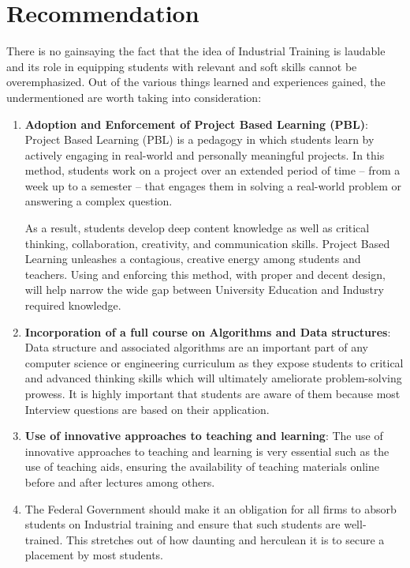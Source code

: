 \section{Recommendation}
There is no gainsaying the fact that the idea of Industrial Training is laudable and its role in equipping students with relevant and soft skills cannot be overemphasized. Out of the various things learned and experiences gained, the undermentioned are worth taking into consideration:
\begin{enumerate}
	\item \textbf{Adoption and Enforcement of Project Based Learning (PBL)}: Project Based Learning (PBL) is a pedagogy in which students learn by actively engaging in real-world and personally meaningful projects. In this method, students work on a project over an extended period of time – from a week up to a semester – that engages them in solving a real-world problem or answering a complex question.
	
	As a result, students develop deep content knowledge as well as critical thinking, collaboration, creativity, and communication skills. Project Based Learning unleashes a contagious, creative energy among students and teachers. Using and enforcing this method, with proper and decent design, will help narrow the wide gap between University Education and Industry required knowledge.
	\item \textbf{Incorporation of a full course on Algorithms and Data structures}: Data structure and associated algorithms are an important part of any computer science or engineering curriculum as they expose students to critical and advanced thinking skills which will ultimately ameliorate problem-solving prowess. It is highly important that students are aware of them because most Interview questions are based on their application.
	\item \textbf{Use of innovative approaches to teaching and
		learning}: The use of innovative approaches to teaching and
	learning is very essential such as the use of teaching aids, ensuring the availability of teaching materials online before and after lectures among others.
	\item The Federal Government should make it an obligation for all firms to absorb students on Industrial training and ensure that such students are well-trained. This stretches out of how daunting and herculean it is to secure a placement by most students.
\end{enumerate}